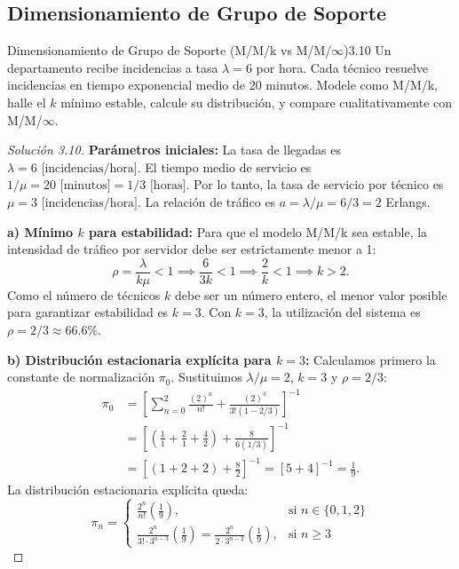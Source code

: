 \documentclass[10pt,a4paper]{article}
\begin{document}
\newpage
\subsection{Dimensionamiento de Grupo de Soporte}

\begin{ejercicio}{Dimensionamiento de Grupo de Soporte (M/M/k vs M/M/$\infty$)}{3.10}
    Un departamento recibe incidencias a tasa $\lambda = 6$ por hora. Cada técnico resuelve incidencias en tiempo exponencial medio de 20 minutos. Modele como M/M/k, halle el $k$ mínimo estable, calcule su distribución, y compare cualitativamente con M/M/$\infty$.
\end{ejercicio}

\begin{proof}[Solución 3.10]
    \textbf{Parámetros iniciales:}
    La tasa de llegadas es $\lambda = 6 \text{ [incidencias/hora]}$.
    El tiempo medio de servicio es $1/\mu = 20 \text{ [minutos]} = 1/3 \text{ [horas]}$.
    Por lo tanto, la tasa de servicio por técnico es $\mu = 3 \text{ [incidencias/hora]}$.
    La relación de tráfico es $a = \lambda / \mu = 6 / 3 = 2$ Erlangs.

    \textbf{a) Mínimo $k$ para estabilidad:}
    Para que el modelo M/M/k sea estable, la intensidad de tráfico por servidor debe ser estrictamente menor a 1:
    \[ \rho = \frac{\lambda}{k\mu} < 1 \implies \frac{6}{3k} < 1 \implies \frac{2}{k} < 1 \implies k > 2. \]
    Como el número de técnicos $k$ debe ser un número entero, el menor valor posible para garantizar estabilidad es \textbf{$k = 3$}.
    Con $k=3$, la utilización del sistema es $\rho = 2/3 \approx 66.6\%$.

    \textbf{b) Distribución estacionaria explícita para $k=3$:}
    Calculamos primero la constante de normalización $\pi_0$. Sustituimos $\lambda/\mu = 2$, $k = 3$ y $\rho = 2/3$:
    \begin{align*}
        \pi_0 &= \left[ \sum_{n=0}^{2} \frac{(2)^n}{n!} + \frac{(2)^3}{3!(1 - 2/3)} \right]^{-1} \\
        &= \left[ \left( \frac{1}{1} + \frac{2}{1} + \frac{4}{2} \right) + \frac{8}{6 (1/3)} \right]^{-1} \\
        &= \left[ (1 + 2 + 2) + \frac{8}{2} \right]^{-1} = [5 + 4]^{-1} = \frac{1}{9}.
    \end{align*}
    La distribución estacionaria explícita queda:
    \[ \pi_n = \begin{cases} 
        \frac{2^n}{n!} \left(\frac{1}{9}\right), & \text{si } n \in \{0, 1, 2\} \\
        \frac{2^n}{3! \cdot 3^{n-3}} \left(\frac{1}{9}\right) = \frac{2^n}{2 \cdot 3^{n-2}} \left(\frac{1}{9}\right), & \text{si } n \ge 3
    \end{cases} \]


\end{proof}
\end{document}
